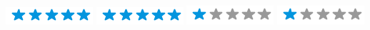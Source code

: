 \documentclass[]{friggeri-cv}
\begin{document}
\begin{aside}
  \section{}
    \textbf{}\includegraphics[scale=0.40]{img/5stars.png}
    \textbf{}\includegraphics[scale=0.40]{img/5stars.png}
    \textbf{}\includegraphics[scale=0.40]{img/1stars.png}
    \textbf{}\includegraphics[scale=0.40]{img/1stars.png}
\end{aside}
\end{document}
